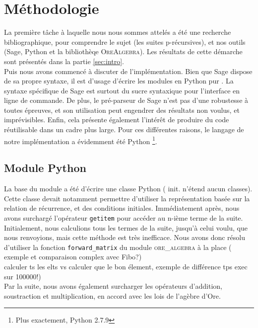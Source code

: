 \documentclass[12pt]{article}
\newlength{\charwidth}
\newcommand{\uline}{\underline{\hspace{2\charwidth}}}
\begin{document}

\section{Méthodologie}
    \label{sec:methodo}
    \par La première tâche à laquelle nous nous sommes attelés a été une recherche bibliographique,
    pour comprendre le sujet (les suites p-récursives), et nos outils (Sage, Python et la 
    bibliothèqe \textsc{OreAlgebra}).
    Les résultats de cette démarche sont présentés dans la partie \ref{sec:intro}.\\
    Puis nous avons commencé à discuter de l'implémentation. Bien que Sage dispose de sa propre
    syntaxe, il est d'usage d'écrire les modules en \og Python pur \fg. La syntaxe spécifique
    de Sage est surtout du sucre syntaxique pour l'interface en ligne de
    commande. De plus, le pré-parseur de Sage n'est pas d'une robustesse à toutes épreuves,
    et son utilisation peut engendrer des résultats non voulus, et imprévisibles. Enfin, 
    cela présente également l'intérêt de produire du code réutilisable dans un cadre plus large.
    Pour ces différentes raisons, le langage de notre implémentation a évidemment été Python
    \footnote{Plus exactement, Python 2.7.9}.
    \subsection{Module Python}
        \label{ssec:py}
        La base du module a été d'écrire une classe Python ({\color{red} init. n'étend aucun classes}). Cette classe devait notamment permettre
        d'utiliser la représentation basée sur la relation de récurrence, et des conditions initiales.
        Immédiatement après, nous avons surchargé l'opérateur \texttt{\uline getitem\uline } pour accéder
        au n-ième terme de la suite. Initialement, nous calculions tous les termes de la suite, jusqu'à 
        celui voulu, que nous renvoyions, mais cette méthode est très inefficace. Nous avons donc résolu
        d'utiliser la fonction \texttt{forward\_matrix} du module \textsc{ore\_algebra} à la place ({\color{red} exemple
        et comparaison complex avec Fibo?}) 
        \\{\color{red}calculer ts les elts vs calculer que le bon élement, exemple de différence tps exec sur 100000!})\\
        Par la suite, nous avons également surcharger les opérateurs d'addition, soustraction et multiplication, 
        en accord avec les lois de l'agèbre d'Ore.
\end{document}
